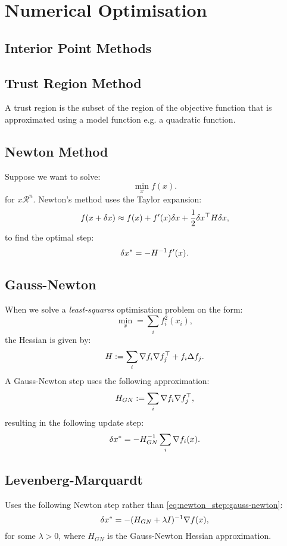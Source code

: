 \chapter{Numerical Optimisation}
\localtableofcontents

\section{Interior Point Methods}

\section{Trust Region Method}

A trust region is the subset of the region of the objective function that
is approximated using a model function e.g. a quadratic function.


\section{Newton Method}

Suppose we want to solve:
\[
\min_x f(x).
\]
for $x\mathcal{R}^n$. Newton's method uses the Taylor expansion:
\[
f(x+\delta x) \approx f(x) + f'(x)\delta x + \frac{1}{2}\delta x^\top H\delta x,
\]
to find the optimal step:
\begin{equation}\label{eq:newton_step}
\delta x^* = - H^{-1} f'(x).
\end{equation}

\section{Gauss-Newton}

When we solve a \emph{least-squares} optimisation problem on the form:
\[
\min_x = \sum_i f_i^2(x_i),
\]
the Hessian  is given by:
\[
H := \sum_i \nabla f_i \nabla f_j^\top  + f_i \Delta f_j.
\]
A Gauss-Newton step uses the following approximation:
\[
H_{GN} := \sum_i \nabla f_i \nabla f_j^\top,
\]
resulting in the following update step:
\begin{equation}\label{eq:newton_step:gauss-newton}
\delta x^* = - H_{GN}^{-1} \sum_i \nabla f_i(x).
\end{equation}

\section{Levenberg-Marquardt}

Uses the following Newton step rather than \eqref{eq:newton_step:gauss-newton}:
\begin{equation}\label{eq:newton_step:lm}
\delta x^* = - (H_{GN} + \lambda I)^{-1} \nabla f(x),
\end{equation}
for some $\lambda>0$, where $H_{GN}$ is the Gauss-Newton Hessian approximation.

